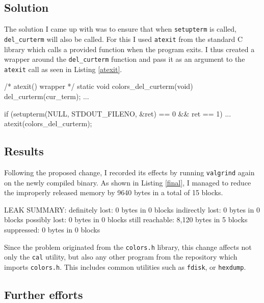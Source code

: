 \documentclass[a4paper,10pt,twocolumn,english]{article}
\begin{document}
\subsection{Solution}

The solution I came up with was to ensure that when \lstinline{setupterm} is
called, \lstinline{del_curterm} will also be called. For this I used
\lstinline{atexit} from the standard C library which calls a provided function
when the program exits. I thus created a wrapper around the
\lstinline{del_curterm} function and pass it as an argument to the
\lstinline{atexit} call as seen in Listing \ref{atexit}.

\begin{code}[language=c, basicstyle=\ttfamily\small,
    caption=Wrapper for atexit, label=atexit]
/* atexit() wrapper */
static void colors_del_curterm(void)
{
	del_curterm(cur_term);
}
...

if (setupterm(NULL, STDOUT_FILENO, &ret) == 0
        && ret == 1) {
    ...
    atexit(colors_del_curterm);
}
\end{code}

\subsection{Results}

Following the proposed change, I recorded its effects by running
\lstinline{valgrind} again on the newly compiled binary. As shown in Listing
\ref{final}, I managed to reduce the improperly released memory by 9640 bytes
in a total of 15 blocks.

\begin{code}[basicstyle=\ttfamily\small,
    caption=Leak Summary after changes, label=final]
LEAK SUMMARY:
   definitely lost: 0 bytes in 0 blocks
   indirectly lost: 0 bytes in 0 blocks
     possibly lost: 0 bytes in 0 blocks
   still reachable: 8,120 bytes in 5 blocks
        suppressed: 0 bytes in 0 blocks
\end{code}

Since the problem originated from the \lstinline{colors.h} library, this change
affects not only the \lstinline{cal} utility, but also any other program from the
repository which imports \lstinline{colors.h}. This includes common utilities
such as \lstinline{fdisk}, or \lstinline{hexdump}.

\subsection{Further efforts}
\end{document}
